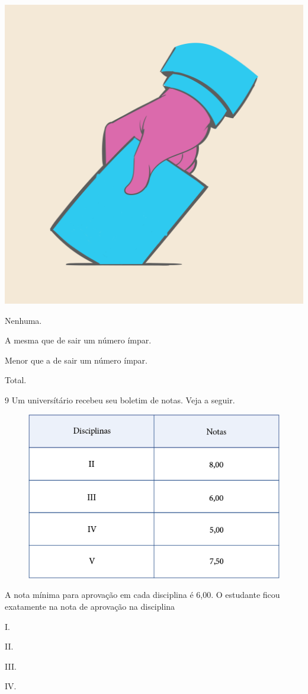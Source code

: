 \begin{center}
\includegraphics[width=.5\textwidth]{media/image84a.jpeg}
\end{center}

\begin{escolha}
\item
  Nenhuma.
\item
  A mesma que de sair um número ímpar.
\item
  Menor que a de sair um número ímpar.
\item
  Total.
\end{escolha}


\num{9} Um universítário recebeu seu boletim de notas. Veja a seguir.

\begin{figure}[htpb!]
\centering
\includegraphics[width=.7\textwidth]{media/image85.png}
\end{figure}

\pagebreak
A nota mínima para aprovação em cada disciplina é 6,00. O estudante ficou exatamente na nota de aprovação na disciplina

\begin{escolha}
\item
  I.
\item
  II.
\item
  III.
\item
  IV.
\end{escolha}


